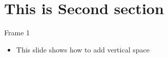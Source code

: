 \section{This is Second section}

\begin{viterbiframe}{Frame 1}
\vskip5cm
\begin{itemize}
\item This slide shows how to add vertical space
\end{itemize}
\end{viterbiframe}

